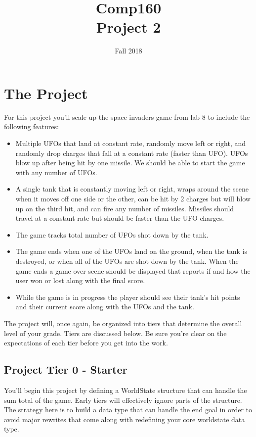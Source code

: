 \documentclass[nobib]{tufte-handout}
\title{Comp160 \\ Project 2 }
\author{}
\date{ Fall 2018 }
\begin{document}
\maketitle

\section*{The Project}

For this project you'll scale up the space invaders game from lab 8 to include the following features:
\begin{itemize}
  \item Multiple UFOs that land at constant rate, randomly move left or right, and randomly drop charges that
     fall at a constant rate (faster than UFO). UFOs blow up after being hit by one missile. We should be able to start
     the game with any number of UFOs.
  \item A single tank that is constantly moving left or right, wraps around the scene when it moves off one side or the other,
    can be hit by 2 charges but will blow up on the third hit, and can fire any number of missiles. Missiles should travel
    at a constant rate but should be faster than the UFO charges.
  \item The game tracks total number of UFOs shot down by the tank.
  \item The game ends when one of the UFOs land on the ground, when the tank is destroyed, or when all of the UFOs are shot down by the tank. When the game ends
  a game over scene should be displayed that reports if and how the user won or lost along with the final score.
  \item While the game is in progress the player should see their tank's hit points and their current score along with the UFOs and the tank.
\end{itemize}

The project will, once again, be organized into tiers that determine the overall level of your grade. Tiers are discussed below. Be sure you're clear on the expectations of each tier before you get into the work.

\subsection*{Project Tier 0 - Starter}

You'll begin this project by defining a WorldState structure that can handle the sum total of the game. Early tiers will effectively ignore parts of the structure. The strategy here is to build a data type that can handle the end goal in order to avoid major rewrites that come along with redefining your core worldstate data type.
\end{document}
